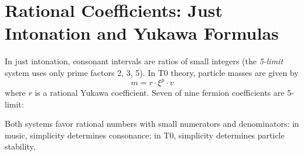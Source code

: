 \section{Rational Coefficients: Just Intonation and Yukawa Formulas}

In just intonation, consonant intervals are ratios of small integers (the \emph{5-limit} system uses only prime factors 2, 3, 5). In T0 theory, particle masses are given by
\begin{equation}
	m = r \cdot \xi^p \cdot v
\end{equation}
where $r$ is a rational Yukawa coefficient. Seven of nine fermion coefficients are 5-limit:

\begin{table}[h]
\centering
{}
\caption{Yukawa coefficients and their musical interpretation. The tau coefficient $25/9 = (5/3)^2$ is the square of the major sixth; its octave-reduced form $25/18$ differs from the classical tritone $45/32$ by exactly one syntonic comma $81/80$.}
\label{tab:yukawa-music}
\end{table}

Both systems favor rational numbers with small numerators and denominators: in music, simplicity determines consonance; in T0, simplicity determines particle stability.

